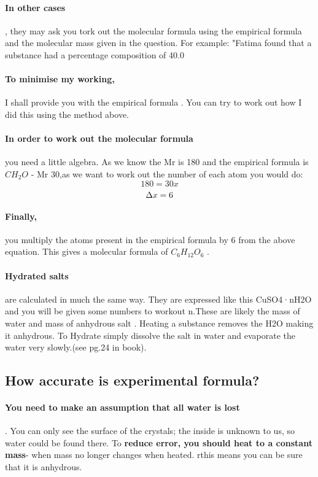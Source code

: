 \paragraph{In other cases}, they may ask you tork out the molecular formula using the empirical formula and the molecular mass given in the question. For example:
"Fatima found that a substance had a percentage composition of 40.0%
\paragraph{To minimise my working,}I shall provide you with the empirical formula . You can try to work out how I did this using the method above.
\paragraph{In order to work out the molecular formula} you need a little algebra. As we know the Mr is 180 and the empirical formula is \(CH_2O\) - Mr 30,as we want to work out the number of each atom you would do:
\newline \[180=30x\] \[\Delta\\x=6\]
\paragraph{Finally,} you multiply the atoms present in the empirical formula by 6 from the above equation. This gives a molecular formula of \(C_6H_{12}O_6\) .
\paragraph{Hydrated salts} are calculated in much the same way. They are expressed
like this CuSO4·nH2O and you will be given some numbers to workout n.These are likely the mass of water and mass of anhydrous salt .
\newline Heating a substance removes the H2O making it anhydrous. To Hydrate simply dissolve the salt in water and evaporate the water very slowly.(see pg.24 in book).
\subsection{How accurate is experimental formula?}
\paragraph{You need to make an assumption that all water is lost}. You can only see the surface of the crystals; the inside is unknown to us, so water could be found there. To \textbf{reduce error, you should heat to a constant mass}- when mass no longer changes when heated. rthis means you can be sure that it is anhydrous.
